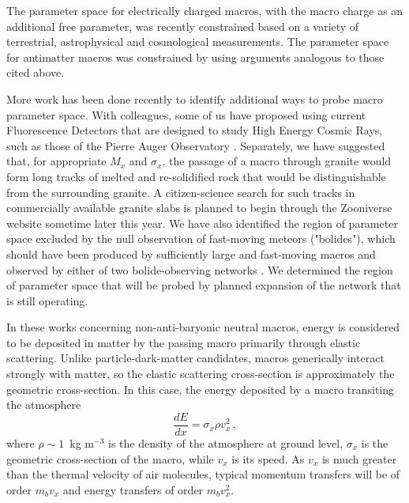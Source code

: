 \documentclass[%
 reprint,
 amsmath,amssymb,
 aps,
]{revtex4-2}
\begin{document}
    The parameter space for electrically charged macros, with the macro charge as an additional free parameter, was recently constrained \citep{Sidhu2020charge} based on a variety of terrestrial, astrophysical and cosmological measurements. The parameter space for antimatter macros was constrained by \citet{Sidhu2020anti} using arguments analogous to those cited above.

    More work has been done recently to identify additional ways to probe macro parameter space. With colleagues, some of us have proposed \citep{Sidhu2018auv} using current Fluorescence Detectors that are designed to study High Energy Cosmic Rays, such as those of the Pierre Auger Observatory \citep{Abraham2010}. Separately, we have suggested \citep{Sidhu2019granite} that, for appropriate $M_x$ and $\sigma_x$, the passage of a macro through granite would form long tracks of melted and re-solidified rock that would be distinguishable from the surrounding granite. A citizen-science search for such tracks in commercially available granite slabs is planned to begin through the Zooniverse website sometime later this year. We have also identified the region of parameter space excluded by the null observation of fast-moving meteors ("bolides"), which should have been produced by sufficiently large and fast-moving macros and observed by either of two bolide-observing networks \citep{Sidhu2019bolide}. We determined the region of parameter space that will be probed by planned expansion of the network that is still operating.

    In these works concerning non-anti-baryonic neutral macros, energy is considered to be deposited in matter by the passing macro primarily through elastic scattering. Unlike particle-dark-matter candidates, macros generically interact strongly with matter, so the elastic scattering cross-section is approximately the geometric cross-section. In this case, the energy deposited by a macro transiting the atmosphere 
    \begin{equation}\label{eq:dedx}
        \frac{dE}{dx} = \sigma_x \rho v_x^2\,,
    \end{equation}
    where $\rho \sim 1\,$ kg m$^{-3}$ is the density of the atmosphere at ground level, $\sigma_x$ is the geometric cross-section of the macro, while $v_x$ is its speed. As $v_x$ is much greater than the thermal velocity of air molecules, typical momentum transfers will be of order $m_b v_{x}$ and energy transfers of order $m_b v_{x}^2$.
\end{document}
